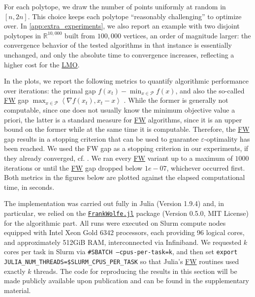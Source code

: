 \documentclass{article}
\newcommand{\R}{\mathbb{R}}
\newcommand{\mP}{\mathcal{P}}
\newcommand{\innp}[1]{\left\langle #1 \right\rangle}
\let\epsilon\varepsilon
\newif\ifTODO
\newcommand{\Dav}[1]{\ifTODO \todo[inline,author=DM, caption={}, color=yellow]{#1} \fi}
\newcommand{\dav}[1]{\ifTODO \todo[size=\scriptsize, color=yellow]{DM: #1}{} \fi}
\newcommand\newlink[2]{\hyperlink{#1}{\normalcolor #2}}
\newcommand{\FW}{\newlink{def:acronym_frank_wolfe}{FW}}
\newcommand{\LMO}{\newlink{def:acronym_linear_minimization_oracle}{LMO}}
\begin{document}
For each polytope, we draw the number of points uniformly at random in $[n, 2n]$. This choice keeps each polytope ``reasonably challenging'' to optimize over.
In \cref{app:extra_experiments}, we also report an example with two disjoint polytopes in $\R^{10,000}$ built from $100,000$ vertices, an order of magnitude larger: the convergence behavior of the tested algorithms in that instance is essentially unchanged, and only the absolute time to convergence increases, reflecting a higher cost for the \LMO{}.

In the plots, we report the following metrics to quantify algorithmic performance over iterations: the primal gap $f(x_t)-\min_{x\in\mP}f(x)$, and also the so-called \FW{} gap $\max_{x \in \mathcal{P}} \innp{\nabla f(x_t), x_t - x}$ \citep{BCC+23}. While the former is generally not computable, since one does not usually know the minimum objective value a priori, the latter is a standard measure for \FW{} algorithms, since it is an upper bound on the former while at the same time it is computable. Therefore, the \FW{} gap results in a stopping criterion that can be used to guarantee $\epsilon$-optimality has been reached. We used the FW gap as a stopping criterion in our experiments, if they already converged, cf. \cite{Jag13}. We ran every \FW{} variant up to a maximum of $1000$ iterations or until the \FW{} gap dropped below $1e-07$, whichever occurred first.
Both metrics in the figures below are plotted against
the elapsed computational time, in seconds.
%

The implementation was carried out fully in Julia (Version 1.9.4) and, in particular, we relied on the \href{https://github.com/ZIB-IOL/FrankWolfe.jl}{\texttt{FrankWolfe.jl}} package (Version 0.5.0, MIT License) for the algorithmic part.
All runs were executed on Slurm compute nodes equipped with Intel Xeon Gold 6342 processors, each providing 96 logical cores, and approximately 512GiB RAM, interconnected via Infiniband.
We requested $k$ cores per task in Slurm via \texttt{\#SBATCH\ --cpus-per-task=k}, and then set \texttt{export JULIA\_NUM\_THREADS=\$SLURM\_CPUS\_PER\_TASK} so that Julia’s \FW{} routines used exactly $k$ threads.
The code for reproducing the results in this section will be made publicly available upon publication and can be found in the supplementary material.
\end{document}
